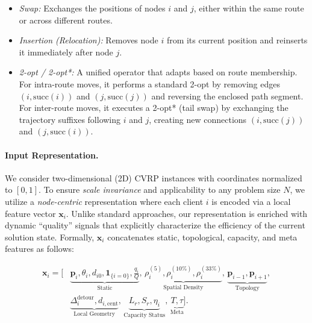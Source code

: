 \documentclass[letterpaper]{article} %
\begin{document}
\begin{itemize}
    \item \textit{Swap:} Exchanges the positions of nodes $i$ and $j$, either within the same route or across different routes.
    \item \textit{Insertion (Relocation):} Removes node $i$ from its current position and reinserts it immediately after node $j$.
    \item \textit{2-opt / 2-opt*:} A unified operator that adapts based on route membership. For intra-route moves, it performs a standard 2-opt by removing edges $(i, \text{succ}(i))$ and $(j, \text{succ}(j))$ and reversing the enclosed path segment. For inter-route moves, it executes a 2-opt* (tail swap) by exchanging the trajectory suffixes following $i$ and $j$, creating new connections $(i, \text{succ}(j))$ and $(j, \text{succ}(i))$.
\end{itemize}

\paragraph{Input Representation.}
We consider two-dimensional (2D) CVRP instances with coordinates normalized to $[0, 1]$. To ensure \textit{scale invariance} and applicability to any problem size $N$, we utilize a \textit{node-centric} representation where each client $i$ is encoded via a local feature vector $\mathbf{x}_i$. Unlike standard approaches, our representation is enriched with dynamic ``quality'' signals that explicitly characterize the efficiency of the current solution state. Formally, $\mathbf{x}_i$ concatenates static, topological, capacity, and meta features as follows:

\begin{equation*}
\begin{split}
    \mathbf{x}_i = \Big[
        & \underbrace{\mathbf{p}_i, \theta_i, d_{i0}, \mathbf{1}_{\{i=0\}}, \tfrac{q_i}{Q}}_{\text{Static}}, \,
          \underbrace{\rho^{(5)}_i, \rho^{(10\%)}_i, \rho^{(33\%)}_i}_{\text{Spatial Density}}, \,
          \underbrace{\mathbf{p}_{i-1}, \mathbf{p}_{i+1}}_{\text{Topology}}, \\
        & \underbrace{\Delta^{\text{detour}}_i, d_{i, \text{cent}}}_{\text{Local Geometry}}, \,
          \underbrace{L_{r}, S_{r}, \eta_i}_{\text{Capacity Status}}, \,
          \underbrace{T, \tau}_{\text{Meta}}
    \Big].
\end{split}
\end{equation*}
\end{document}
